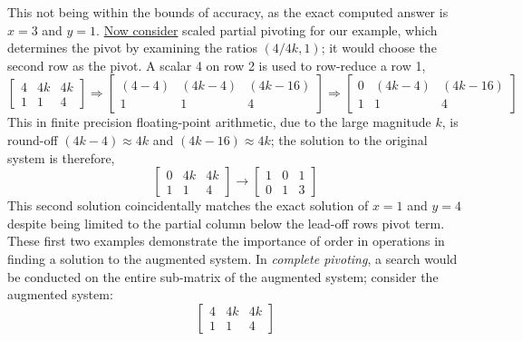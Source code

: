 \documentclass[7pt]{article}
\begin{document}
This not being within the bounds of accuracy, as the exact computed answer is $x=3$ and $y=1$. \underline{Now consider} scaled partial pivoting for our example, which determines the pivot by examining the ratios $(4/4k,1 )$;  it would choose the second row as the pivot. A scalar 4 on row 2 is used to row-reduce a row 1, 
\begin{equation*}
\left[
\begin{array}{cc|c}%
4 & 4k & 4k \\  
1& 1& 4
\end{array}  
\right]
\Rightarrow
\left[
\begin{array} {cc|c}%
(4 - 4) & (4k - 4) & (4k - 16) \\  
1 & 1 & 4
\end{array}  
\right]
\Rightarrow
\left[
\begin{array} {cc|c}%
0 & (4k - 4) & (4k - 16) \\  
1 & 1 & 4 
\end{array}  
\right]
\end{equation*}
This in finite precision floating-point arithmetic, due to the large magnitude $k$, is round-off $(4k -4) \approx 4k$ and $(4k - 16) \approx 4k$; the solution to the original system is therefore,
\begin{equation*}
\left[
\begin{array} {cc|c}%
0 & 4k & 4k \\  
1 & 1 & 4
\end{array} \right]  \rightarrow \left[ \begin{array}   {cc|c}%
1 & 0 & 1\\  
0 & 1 & 3
\end{array} 
\right]
\end{equation*}
This second solution coincidentally matches the exact solution of $x = 1$ and $y =4$ despite being limited to the partial column below the lead-off rows pivot term. These first two examples demonstrate the importance of order in operations in finding a solution to the augmented system.  In \emph{complete pivoting}, a search would be conducted on the entire sub-matrix of the augmented system; consider the augmented system:
\begin{equation*}
\left[
\begin{array} {cc|c}%
4 & 4k & 4k \\  
1 & 1 & 4
\end{array} \right] 
\end{equation*}
\end{document}
